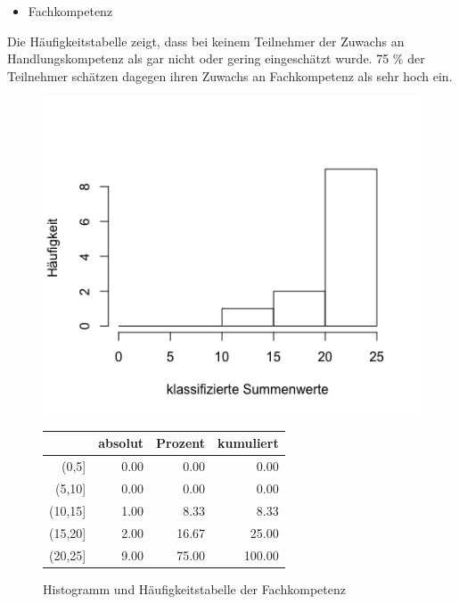 \documentclass[12pt, bibliography=totoc]{scrartcl}
\begin{document}
\begin{itemize}
\tightlist
\item
  Fachkompetenz
\end{itemize}

Die Häufigkeitstabelle zeigt, dass bei keinem Teilnehmer der Zuwachs an
Handlungskompetenz als gar nicht oder gering eingeschätzt wurde. 75 \%
der Teilnehmer schätzen dagegen ihren Zuwachs an Fachkompetenz als sehr
hoch ein.

\begin{figure}[H]
\begin{minipage}{.5\linewidth}
\includegraphics[width=1.0\linewidth]{Anhang/FKHistn.png}

\label{pic:aufbau}
\end{minipage}
\begin{minipage}{.5\linewidth}
\centering
\raisebox{\depth}
{\begin{tabular}{rrrr}
  \hline
 & absolut & Prozent & kumuliert \\
  \hline
(0,5] & 0.00 & 0.00 & 0.00 \\
  (5,10] & 0.00 & 0.00 & 0.00 \\
  (10,15] & 1.00 & 8.33 & 8.33 \\
  (15,20] & 2.00 & 16.67 & 25.00 \\
  (20,25] & 9.00 & 75.00 & 100.00 \\
   \hline
\end{tabular}

}
\label{tab:defis}
\end{minipage}
\caption{Histogramm und Häufigkeitstabelle der Fachkompetenz}
\end{figure}
\end{document}
